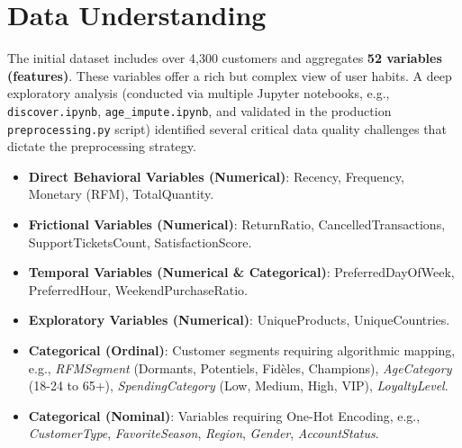 \documentclass[11pt,a4paper]{article}
\begin{document}
\section{Data Understanding}

The initial dataset includes over 4,300 customers and aggregates \textbf{52 variables (features)}. These variables offer a rich but complex view of user habits. A deep exploratory analysis (conducted via multiple Jupyter notebooks, e.g., \texttt{discover.ipynb}, \texttt{age\_impute.ipynb}, and validated in the production \texttt{preprocessing.py} script) identified several critical data quality challenges that dictate the preprocessing strategy.

\begin{tcolorbox}[title=Variable Typology \& Cardinality]
\begin{itemize}
    \item \textbf{Direct Behavioral Variables (Numerical)}: Recency, Frequency, Monetary (RFM), TotalQuantity.
    \item \textbf{Frictional Variables (Numerical)}: ReturnRatio, CancelledTransactions, SupportTicketsCount, SatisfactionScore.
    \item \textbf{Temporal Variables (Numerical \& Categorical)}: PreferredDayOfWeek, PreferredHour, WeekendPurchaseRatio.
    \item \textbf{Exploratory Variables (Numerical)}: UniqueProducts, UniqueCountries.
    \item \textbf{Categorical (Ordinal)}: Customer segments requiring algorithmic mapping, e.g., \textit{RFMSegment} (Dormants, Potentiels, Fidèles, Champions), \textit{AgeCategory} (18-24 to 65+), \textit{SpendingCategory} (Low, Medium, High, VIP), \textit{LoyaltyLevel}.
    \item \textbf{Categorical (Nominal)}: Variables requiring One-Hot Encoding, e.g., \textit{CustomerType}, \textit{FavoriteSeason}, \textit{Region}, \textit{Gender}, \textit{AccountStatus}.
\end{itemize}
\end{tcolorbox}
\end{document}
